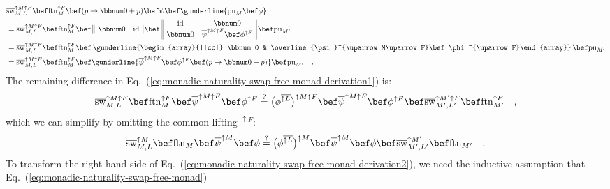 \begin{align*}
 & \overline{\text{sw}}_{M,L}^{\uparrow M\uparrow F}\bef\text{ftn}_{M}^{\uparrow F}\bef(p\rightarrow\bbnum 0+p)\bef\psi\bef\gunderline{\text{pu}_{M}\bef\phi}\\
 & =\overline{\text{sw}}_{M,L}^{\uparrow M\uparrow F}\bef\text{ftn}_{M}^{\uparrow F}\bef\,\begin{array}{||cc|}
\bbnum 0 & \text{id}\end{array}\,\bef\,\begin{array}{||cc|}
\text{id} & \bbnum 0\\
\bbnum 0 & \overline{\psi}^{\uparrow M\uparrow F}\bef\phi^{\uparrow F}
\end{array}\,\bef\text{pu}_{M^{\prime}}\\
 & =\overline{\text{sw}}_{M,L}^{\uparrow M\uparrow F}\bef\text{ftn}_{M}^{\uparrow F}\bef\,\gunderline{\begin{array}{||cc|}
\bbnum 0 & \overline{\psi}^{\uparrow M\uparrow F}\bef\phi^{\uparrow F}\end{array}}\,\bef\text{pu}_{M^{\prime}}\\
 & =\overline{\text{sw}}_{M,L}^{\uparrow M\uparrow F}\bef\text{ftn}_{M}^{\uparrow F}\bef\gunderline{\overline{\psi}^{\uparrow M\uparrow F}\bef\phi^{\uparrow F}\bef(p\rightarrow\bbnum 0+p)}\bef\text{pu}_{M^{\prime}}\quad.
\end{align*}
The remaining difference in Eq.~(\ref{eq:monadic-naturality-swap-free-monad-derivation1})
is:
\[
\overline{\text{sw}}_{M,L}^{\uparrow M\uparrow F}\bef\text{ftn}_{M}^{\uparrow F}\bef\overline{\psi}^{\uparrow M\uparrow F}\bef\phi^{\uparrow F}\overset{?}{=}\big(\phi^{\overline{\uparrow L}}\big)^{\uparrow M\uparrow F}\bef\overline{\psi}^{\uparrow M\uparrow F}\bef\phi^{\uparrow F}\bef\overline{\text{sw}}_{M^{\prime},L^{\prime}}^{\uparrow M^{\prime}\uparrow F}\bef\text{ftn}_{M^{\prime}}^{\uparrow F}\quad,
\]
which we can simplify by omitting the common lifting $^{\uparrow F}$:
\begin{equation}
\overline{\text{sw}}_{M,L}^{\uparrow M}\bef\text{ftn}_{M}\bef\overline{\psi}^{\uparrow M}\bef\phi\overset{?}{=}\big(\phi^{\overline{\uparrow L}}\big)^{\uparrow M}\bef\overline{\psi}^{\uparrow M}\bef\phi\bef\overline{\text{sw}}_{M^{\prime},L^{\prime}}^{\uparrow M^{\prime}}\bef\text{ftn}_{M^{\prime}}\quad.\label{eq:monadic-naturality-swap-free-monad-derivation2}
\end{equation}
To transform the right-hand side of Eq.~(\ref{eq:monadic-naturality-swap-free-monad-derivation2}),
we need the inductive assumption that Eq.~(\ref{eq:monadic-naturality-swap-free-monad})
